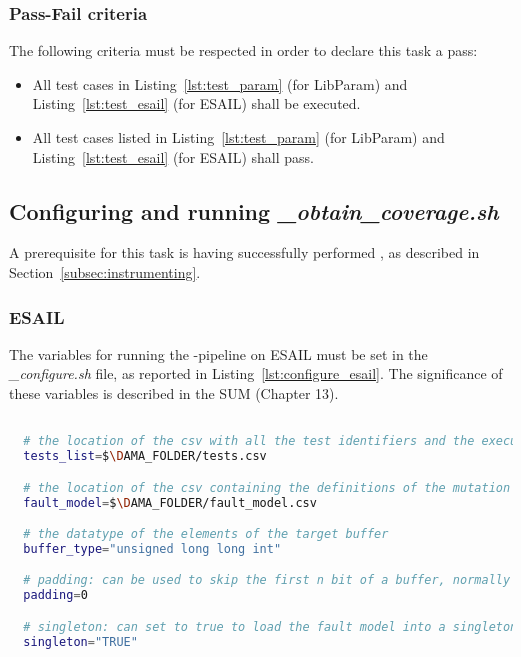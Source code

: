   \subsubsection{Pass-Fail criteria}

  The following criteria must be respected in order to declare this task a pass:

  \begin{itemize}
    \item All test cases in Listing~\ref{lst:test_param} (for LibParam) and Listing~\ref{lst:test_esail} (for ESAIL) shall be executed.
    \item All test cases listed in Listing~\ref{lst:test_param} (for LibParam) and Listing~\ref{lst:test_esail} (for ESAIL) shall pass.
  \end{itemize}

\subsection{Configuring and running \emph{\DAMA\_obtain\_coverage.sh}}

A prerequisite for this task is having successfully performed , as described in Section~\ref{subsec:instrumenting}.

\subsubsection{ESAIL}

The variables for running the \DAMA-pipeline on ESAIL must be set in the \emph{\DAMA\_configure.sh} file, as reported in Listing~\ref{lst:configure_esail}. The significance of these variables is described in the SUM (Chapter 13).

  \begin{lstlisting}[language=bash, label={lst:configure_esail}]

  # the location of the csv with all the test identifiers and the execution time
  tests_list=$\DAMA_FOLDER/tests.csv

  # the location of the csv containing the definitions of the mutation operators
  fault_model=$\DAMA_FOLDER/fault_model.csv

  # the datatype of the elements of the target buffer
  buffer_type="unsigned long long int"

  # padding: can be used to skip the first n bit of a buffer, normally set to 0
  padding=0

  # singleton: can set to true to load the fault model into a singleton   variable, normally set to "TRUE", can also  be set to "FALSE"
  singleton="TRUE"

  \end{lstlisting}

